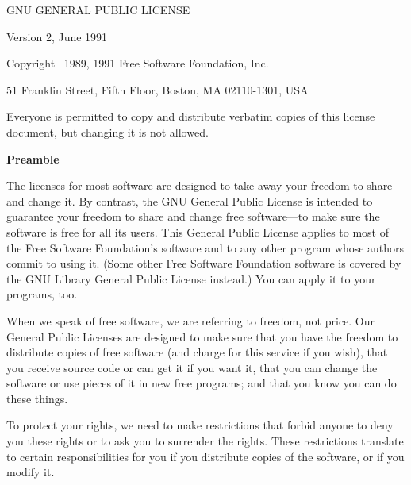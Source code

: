\newsavebox{\gpl}
\begin{lrbox}{\gpl}
\begin{minipage}{3\textwidth}
\columnsep
\begin{multicols}{3}
\begin{center}
{\Large GNU GENERAL PUBLIC LICENSE\par}
\bigskip
{Version 2, June 1991}
\end{center}

\begin{center}
{\parindent 0in

Copyright \textcopyright\ 1989, 1991 Free Software Foundation, Inc.

\bigskip

51 Franklin Street, Fifth Floor, Boston, MA  02110-1301, USA

\bigskip

Everyone is permitted to copy and distribute verbatim copies
of this license document, but changing it is not allowed.
}
\end{center}

\begin{center}
{\bf\large Preamble}
\end{center}


The licenses for most software are designed to take away your freedom to
share and change it.  By contrast, the GNU General Public License is
intended to guarantee your freedom to share and change free software---to
make sure the software is free for all its users.  This General Public
License applies to most of the Free Software Foundation's software and to
any other program whose authors commit to using it.  (Some other Free
Software Foundation software is covered by the GNU Library General Public
License instead.)  You can apply it to your programs, too.

When we speak of free software, we are referring to freedom, not price.
Our General Public Licenses are designed to make sure that you have the
freedom to distribute copies of free software (and charge for this service
if you wish), that you receive source code or can get it if you want it,
that you can change the software or use pieces of it in new free programs;
and that you know you can do these things.

To protect your rights, we need to make restrictions that forbid anyone to
deny you these rights or to ask you to surrender the rights.  These
restrictions translate to certain responsibilities for you if you
distribute copies of the software, or if you modify it.


\end{multicols}
\end{minipage}
\end{lrbox}
